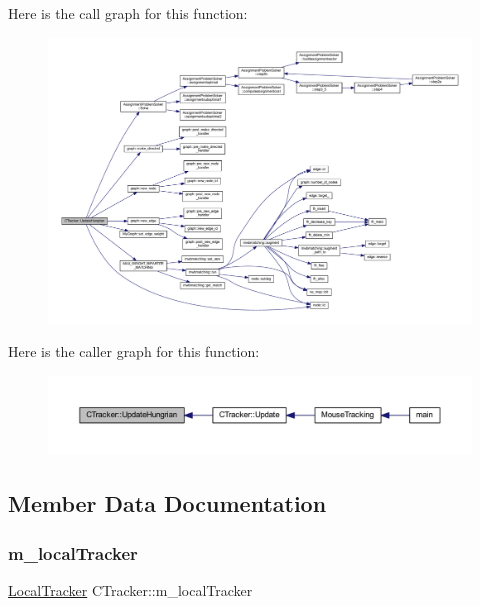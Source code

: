 Here is the call graph for this function\+:\nopagebreak
\begin{figure}[H]
\begin{center}
\leavevmode
\includegraphics[width=350pt]{class_c_tracker_a9fd9223baba528c3c6522241391126ef_cgraph}
\end{center}
\end{figure}
Here is the caller graph for this function\+:\nopagebreak
\begin{figure}[H]
\begin{center}
\leavevmode
\includegraphics[width=350pt]{class_c_tracker_a9fd9223baba528c3c6522241391126ef_icgraph}
\end{center}
\end{figure}


\subsection{Member Data Documentation}
\mbox{\label{class_c_tracker_a0f7f687608e94fb1c1a94f49e7c2c784}} 
\subsubsection{\texorpdfstring{m\+\_\+local\+Tracker}{m\_localTracker}}
{\footnotesize\ttfamily \mbox{\hyperlink{class_local_tracker}{Local\+Tracker}} C\+Tracker\+::m\+\_\+local\+Tracker\hspace{0.3cm}{\ttfamily [private]}}



